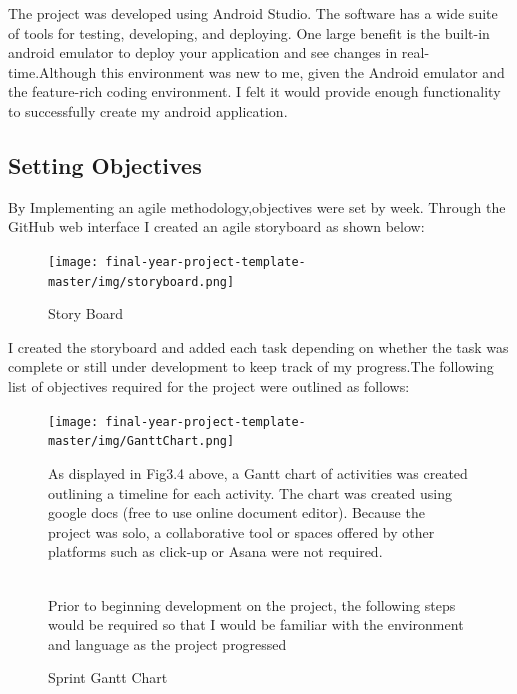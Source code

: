   The project was developed using Android Studio. The software has a wide suite of tools for testing, developing, and deploying. One large benefit is the built-in android emulator to deploy your application and see changes in real-time.Although this environment was new to me, given the Android emulator  and the feature-rich coding environment. I felt it would provide enough functionality to successfully create my android application.
    
    

    \subsection{ Setting Objectives   }
    
By Implementing an agile methodology,objectives were set by  week. Through the GitHub  web interface  I  created an  agile storyboard as shown below:
    
    
       \begin{figure}[H]
  \centering
    \texttt{[image: final-year-project-template-master/img/storyboard.png]}
     \caption{Story Board }
\end{figure}


    I created the storyboard and added each task depending on  whether the  task was complete or still under development to keep track of my progress.The following list of objectives required for the project were outlined as follows:
    
    
    
    
    
    
     \begin{figure}[H]
  \centering
    \texttt{[image: final-year-project-template-master/img/GanttChart.png]}
     \caption{Sprint Gantt Chart }
     
    As displayed in Fig3.4 above, a Gantt chart of activities was created outlining a timeline for each activity. The chart was created using google docs (free to use online document editor). Because the project was solo, a collaborative tool or spaces offered by other platforms such as click-up or Asana were not required.
    
    
    \\Prior to beginning development on the project, the following steps would be required so that I would be familiar with the environment and language as the project progressed
    
     
     
\end{figure}
    
